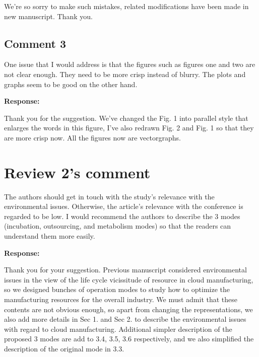 \documentclass{article}
\begin{document}
We're so sorry to make such mistakes, related modifications have been made in new manuscript. Thank you.

\subsection*{Comment 3} %
One issue that I would address is that the figures such as figures one and two are not clear enough.  They need to be more crisp instead of blurry. The plots and graphs seem to be good on the other hand.

\textbf{Response:}

Thank you for the suggestion. We've changed the Fig. 1 into parallel style that enlarges the words in this figure, I've also redrawn Fig. 2 and Fig. 1 so that they are more crisp now. All the figures now are vectorgraphs.

\section*{Review 2's comment} %
The authors should get in touch with the study's relevance with the environmental issues. Otherwise, the article's relevance with the conference is regarded to be low.
I would recommend the authors to describe the 3 modes (incubation, outsourcing, and metabolism modes) so that the readers can understand them more easily.

\textbf{Response:}

Thank you for your suggestion. Previous manuscript considered environmental issues in the view of the life cycle vicissitude of resource in cloud manufacturing, so we designed bunches of operation modes to study how to optimize the manufacturing resources for the overall industry. We must admit that these contents are not obvious enough, so apart from changing the representations, we also add more details in Sec 1. and Sec 2. to describe the environmental issues with regard to cloud manufacturing. Additional simpler description of the proposed 3 modes are add to 3.4, 3.5, 3.6 respectively, and we also simplified the description of the original mode in 3.3.
\end{document}

